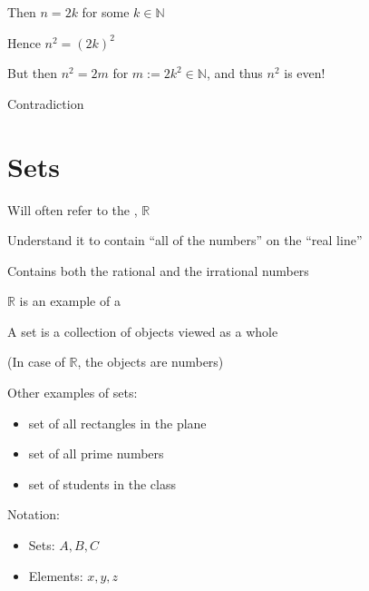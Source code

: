 \documentclass[letterpaper,10pt,english]{jupyterBook}
\begin{document}
\sphinxAtStartPar
Then \(n = 2k\) for some \(k \in \mathbb{N}\)

\sphinxAtStartPar
Hence \(n^2 = (2k)^2\)

\sphinxAtStartPar
But then \(n^2 = 2m\) for \(m := 2k^2 \in \mathbb{N}\), and thus \(n^2\) is even!

\sphinxAtStartPar
Contradiction


\section{Sets}
\label{\detokenize{03.set_theory:sets}}
\sphinxAtStartPar
Will often refer to the ,  \(\mathbb{R}\)

\sphinxAtStartPar
Understand it to contain “all of the numbers” on the “real line”

\begin{figure}[htbp]
\centering

\noindent{}
\end{figure}

\sphinxAtStartPar
Contains both the rational and the irrational numbers

\sphinxAtStartPar
\(\mathbb{R}\) is an example of a 

\sphinxAtStartPar
A set is a collection of objects viewed as a whole

\sphinxAtStartPar
(In case of \(\mathbb{R}\), the objects are numbers)

\sphinxAtStartPar
Other examples of sets:
\begin{itemize}
\item {} 
\sphinxAtStartPar
set of all rectangles in the plane

\item {} 
\sphinxAtStartPar
set of all prime numbers

\item {} 
\sphinxAtStartPar
set of students in the class

\end{itemize}

\sphinxAtStartPar
Notation:
\begin{itemize}
\item {} 
\sphinxAtStartPar
Sets: \(A, B, C\)

\item {} 
\sphinxAtStartPar
Elements: \(x,y,z\)

\end{itemize}
\end{document}
